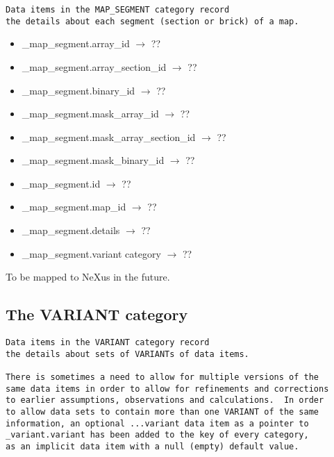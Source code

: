 \documentclass[11pt]{article}
\begin{document}
{{{\footnotesize\begin{verbatim}
Data items in the MAP_SEGMENT category record
the details about each segment (section or brick) of a map.
\end{verbatim}}

\begin{itemize}

\item{\_map\_segment.array\_id $\rightarrow$ ??}

\item{\_map\_segment.array\_section\_id $\rightarrow$ ??}

\item{\_map\_segment.binary\_id $\rightarrow$ ??}

\item{\_map\_segment.mask\_array\_id $\rightarrow$ ??}

\item{\_map\_segment.mask\_array\_section\_id $\rightarrow$ ??}

\item{\_map\_segment.mask\_binary\_id $\rightarrow$ ??}

\item{\_map\_segment.id $\rightarrow$ ??}

\item{\_map\_segment.map\_id $\rightarrow$ ??}

\item{\_map\_segment.details $\rightarrow$ ??}

\item{\_map\_segment.variant category $\rightarrow$ ??}
\end{itemize}

To be mapped to NeXus in the future.

\subsection{The VARIANT category}

{\footnotesize\begin{verbatim}
Data items in the VARIANT category record
the details about sets of VARIANTs of data items.

There is sometimes a need to allow for multiple versions of the
same data items in order to allow for refinements and corrections
to earlier assumptions, observations and calculations.  In order
to allow data sets to contain more than one VARIANT of the same
information, an optional ...variant data item as a pointer to
_variant.variant has been added to the key of every category,
as an implicit data item with a null (empty) default value.


\end{verbatim}}}}
\end{document}
